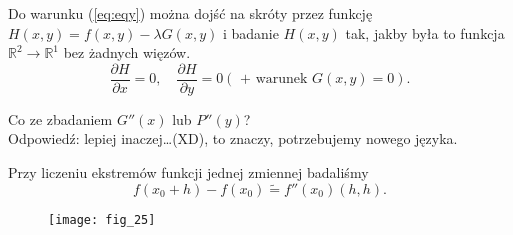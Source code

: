 \documentclass[../main.tex]{subfiles}
\begin{document}
    \begin{obserwacja}
        Do warunku (\ref{eq:eqy}) można dojść na skróty przez funkcję $H(x,y) = f(x,y) - \lambda G(x,y)$ i badanie $H(x,y)$ tak, jakby była to funkcja $\mathbb{R}^2\to \mathbb{R}^1$ bez żadnych więzów.\\
        \[
            \frac{\partial H}{\partial x} = 0, \quad \frac{\partial H}{\partial y} = 0 \left( \text{ + warunek } G(x,y) = 0 \right)
        .\]
    \end{obserwacja}
    \begin{pytanie}
        Co ze zbadaniem $G''(x)$ lub $P''(y)$?\\
        Odpowiedź: lepiej inaczej\ldots (XD), to znaczy, potrzebujemy nowego języka.
    \end{pytanie}

    Przy liczeniu ekstremów funkcji jednej zmiennej badaliśmy \[
        f(x_0+h) - f(x_0) \tilde = f''(x_0)(h,h)
    .\]

    \begin{figure}
        \centering
        \texttt{[image: fig\_25]}
        \caption{}
        \label{fig:fig_25}
    \end{figure}
\end{document}

